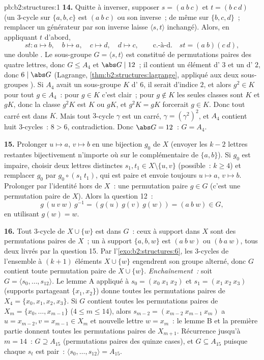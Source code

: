 \begin{solution}{pb:b2:structures:1}
\textbf{14.} Quitte à inverser, supposer $s = (a\ b\ c)$ et $t =
(b\ c\ d)$ (un $3$-cycle sur $\{a,b,c\}$ est $(a\ b\ c)$ ou son
inverse~; de même sur $\{b,c,d\}$~; remplacer un générateur par son
inverse laisse $\langle s, t\rangle$ inchangé). Alors, en appliquant
$t$ d'abord,
\[
st \colon a \mapsto b,\quad b \mapsto a,\quad c \mapsto d,\quad
d \mapsto c, \qquad\text{c.-à-d.}\quad st = (a\ b)(c\ d),
\]
une double . Le sous-groupe $G = \langle s, t\rangle$
est constitué de permutations paires des quatre lettres, donc $G \leq
A_4$ et $\abs G \mid 12$~; il contient un élément d' $3$
et un d' $2$, donc $6 \mid \abs G$ (Lagrange,
\cref{thm:b2:structures:lagrange}, appliqué aux deux sous-groupes
). Si $A_4$ avait un sous-groupe $K$ d' $6$, il serait
d'indice $2$, et alors $g^2 \in K$ pour tout $g \in A_4$~: pour
$g \in K$ c'est clair~; pour $g \notin K$ les seules classes sont
$K$ et $gK$, donc la classe $g^2K$ est $K$ ou $gK$, et $g^2K =
gK$ forcerait $g \in K$. Donc tout carré est dans $K$. Mais tout
$3$-cycle $\gamma$ est un carré, $\gamma = (\gamma^2)^2$, et
$A_4$ contient huit $3$-cycles~: $8 > 6$, contradiction. Donc
$\abs G = 12$~: $G = A_4$.

\textbf{15.} Prolonger $u \mapsto a$, $v \mapsto b$ en une bijection
$g_0$ de $X$ (envoyer les $k - 2$ lettres restantes bijectivement
n'importe où sur le complémentaire de $\{a, b\}$). Si $g_0$ est
impaire, choisir deux lettres distinctes $s_1, t_1 \in X \setminus
\{u, v\}$ (possible~: $k \geq 4$) et remplacer $g_0$ par $g_0 \circ
(s_1\ t_1)$, qui est paire et envoie toujours $u \mapsto a$, $v
\mapsto b$. Prolonger par l'identité hors de $X$~: une permutation
paire $g \in G$ (c'est une permutation paire de $X$). Alors la
question 12~:
\[
g\,(u\ v\ w)\,g^{-1} = (g(u)\ g(v)\ g(w)) = (a\ b\ w) \in G,
\]
en utilisant $g(w) = w$.

\textbf{16.} Tout $3$-cycle de $X \cup \{w\}$ est dans $G$~: ceux à
support dans $X$ sont des permutations paires de $X$~; un à support
$\{a, b, w\}$ est $(a\ b\ w)$ ou $(b\ a\ w)$, tous deux livrés par la
question 15. Par l'\cref{exo:b2:structures:6}, les $3$-cycles de
l'ensemble à $(k+1)$ éléments $X \cup \{w\}$ engendrent son groupe
alterné, donc $G$ contient toute permutation paire de $X \cup \{w\}$.
\emph{Enchaînement~:} soit $G = \langle s_0, \dots, s_{12}\rangle$. Le
lemme A appliqué à $s_0 = (x_0\ x_1\ x_2)$ et $s_1 = (x_1\ x_2\
x_3)$ (supports partageant $\{x_1, x_2\}$) donne toutes les
permutations paires de $X_4 = \{x_0, x_1, x_2, x_3\}$. Si $G$ contient
toutes les permutations paires de $X_m = \{x_0, \dots, x_{m-1}\}$ ($4
\leq m \leq 14$), alors $s_{m-2} = (x_{m-2}\ x_{m-1}\ x_m)$ a $u =
x_{m-2}, v = x_{m-1} \in X_m$ et nouvelle lettre $w = x_m$~: le lemme
B et la première partie donnent toutes les permutations paires de
$X_{m+1}$. Récurrence jusqu'à $m = 14$~: $G \supseteq A_{15}$
(permutations paires des quinze cases), et $G \subseteq A_{15}$
puisque chaque $s_t$ est pair~: $\langle s_0, \dots, s_{12}\rangle =
A_{15}$.


\end{solution}
